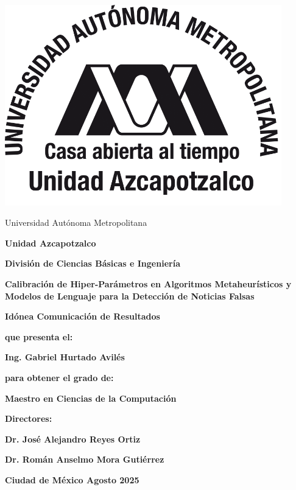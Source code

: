 \thispagestyle{empty}

\begin{minipage}{0.18\textwidth}
	\includegraphics[width=0.9\textwidth]{./Imagenes/uam.png}
\end{minipage}%
\begin{minipage}{0.82\textwidth}
\begin{center}
	\large \sc Universidad Autónoma Metropolitana
\end{center}
\end{minipage}

\vspace{0.5cm}
\centerline{\Large \bf Unidad Azcapotzalco}
\vspace{0.5cm}
\centerline{\Large \bf División de Ciencias Básicas e Ingeniería}

\begin{center}
\Large \bf
Calibración de Hiper-Parámetros en Algoritmos Metaheurísticos y Modelos de Lenguaje para la Detección de Noticias Falsas
\end{center}

\centerline{\Large \bf Idónea Comunicación de Resultados}

\vspace{0.8cm}
\centerline{\large \bf que presenta el:}
\vspace{0.3cm}
\centerline{\Large \bf Ing. Gabriel Hurtado Avilés}
\vspace{0.5cm}
\centerline{\large \bf para obtener el grado de:}
\vspace{0.3cm}
\centerline{\Large \bf Maestro en Ciencias de la Computación}
\vspace{1.2cm}
\centerline{\Large \bf Directores:}
\vspace{0.5cm}
\centerline{\Large \bf Dr. José Alejandro Reyes Ortiz}
\vspace{0.3cm}
\centerline{\Large \bf Dr. Román Anselmo Mora Gutiérrez}
 
\vspace{1.2cm}
{\large \bf Ciudad de México \hfill Agosto 2025}